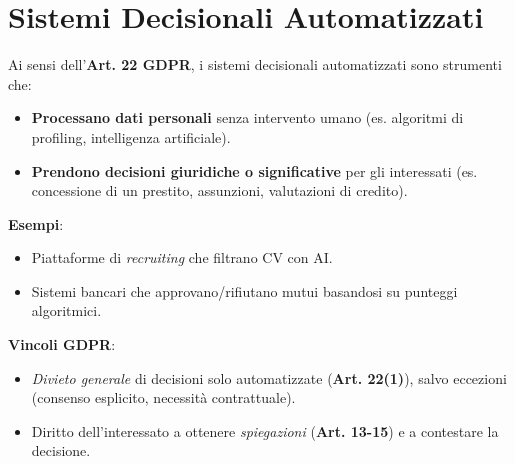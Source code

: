 \documentclass[8pt,oneside,a4paper]{article}
\begin{document}
	\section{Sistemi Decisionali Automatizzati}
	Ai sensi dell’\textbf{Art. 22 GDPR}, i sistemi decisionali automatizzati sono strumenti che:  
	\begin{itemize}  
		\item \textbf{Processano dati personali} senza intervento umano (es. algoritmi di profiling, intelligenza artificiale).  
		\item \textbf{Prendono decisioni giuridiche o significative} per gli interessati (es. concessione di un prestito, assunzioni, valutazioni di credito).  
	\end{itemize}  
	\noindent \textbf{Esempi}:  
	\begin{itemize}  
		\item Piattaforme di \textit{recruiting} che filtrano CV con AI.  
		\item Sistemi bancari che approvano/rifiutano mutui basandosi su punteggi algoritmici.  
	\end{itemize}  
	\noindent \textbf{Vincoli GDPR}:  
	\begin{itemize}  
		\item \textit{Divieto generale} di decisioni solo automatizzate (\textbf{Art. 22(1)}), salvo eccezioni (consenso esplicito, necessità contrattuale).  
		\item Diritto dell’interessato a ottenere \textit{spiegazioni} (\textbf{Art. 13-15}) e a contestare la decisione.  
	\end{itemize}  
\end{document}
